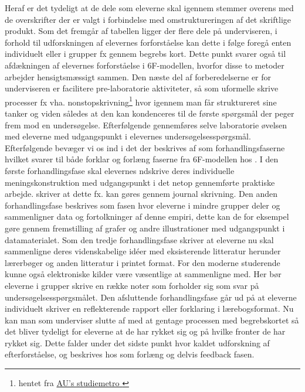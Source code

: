 Heraf er det tydeligt at de dele som eleverne skal igennem stemmer overens med de overskrifter der er valgt i forbindelse med omstruktureringen af det skriftlige produkt. Som det fremgår af tabellen ligger der flere dele på underviseren, i forhold til udforskningen af elevernes forforståelse kan dette i følge \citet{Hand2004} foregå enten individuelt eller i grupper fx gennem begrebs kort. Dette punkt svarer også til afdækningen af elevernes forforståelse i 6F-modellen, hvorfor disse to metoder arbejder hensigtsmæssigt sammen. Den næste del af forberedelserne er for underviseren er facilitere pre-laboratorie aktiviteter, så som uformelle skrive processer fx vha. nonstopskrivning\footnote{hentet fra \href{http://studypedia.au.dk/fileadmin/www.studiemetro.au.dk/Pink__At_skrive_universitetsopgaver/nonstop/nonstop.html}{AU's studiemetro }} hvor igennem man får struktureret sine tanker og viden således at den kan kondenceres til de første spørgsmål der peger frem mod en undersøgelse. Efterfølgende gennemføres selve laboratorie øvelsen med eleverne med udgangspunkt i elevernes undersøgelsesspørgsmål. Efterfølgende bevæger vi os ind i det der beskrives af \citet{Keys1999,Hand2004} som forhandlingsfaserne hvilket svarer til både forklar og forlæng faserne fra 6F-modellen hos \citep{Dolin2014}. I den første forhandlingsfase skal elevernes ndskrive deres individuelle meningskonstruktion med udgangspunkt i det netop gennemførte praktiske arbejde. \citet{Hand2004} skriver at dette fx. kan gøres gennem journal skrivning. Den anden forhandlingsfase beskrives som fasen hvor eleverne i mindre grupper deler og sammenligner data og fortolkninger af denne empiri, dette kan de for eksempel gøre gennem fremstilling af grafer og andre illustrationer med udgangspunkt i datamaterialet. Som den tredje forhandlingsfase skriver \citet{Hand2004} at eleverne nu skal sammenligne deres videnskabelige idéer med eksisterende litteratur herunder lærerbøger og anden litteratur i printet format. For den moderne studerende kunne også elektroniske kilder være væsentlige at sammenligne med. Her bør eleverne i grupper skrive en række noter som forholder sig som svar på undersøgelsesspørgsmålet. Den afsluttende forhandlingsfase går ud på at eleverne individuelt skriver en reflekterende rapport eller forklaring i lærebogsformat.
Nu kan man som underviser slutte af med at gentage processen med begrebskortet så det bliver tydeligt for eleverne at de har rykket sig og på hvilke fronter de har rykket sig. Dette falder under det sidste punkt hvor kaldet udforskning af efterforståelse, og beskrives hos \citet{Dolin2014} som forlæng og delvis feedback fasen.
